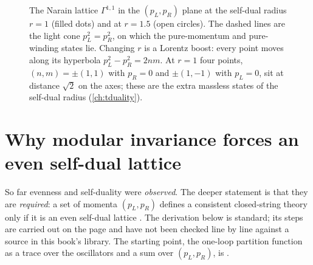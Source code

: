 \begin{figure}[t]
\centering
{}
\caption{The Narain lattice $\Gamma^{1,1}$ in the $(p_L,p_R)$ plane at the self-dual radius
$r=1$ (filled dots) and at $r=1.5$ (open circles). The dashed lines are the light cone
$p_L^2=p_R^2$, on which the pure-momentum and pure-winding states lie. Changing $r$ is a
Lorentz boost: every point moves along its hyperbola $p_L^2-p_R^2=2nm$. At $r=1$ four points,
$(n,m)=\pm(1,1)$ with $p_R=0$ and $\pm(1,-1)$ with $p_L=0$, sit at distance $\sqrt2$ on the
axes; these are the extra massless states of the self-dual radius (\cref{ch:tduality}).}
\label{fig:narain:boost}
\end{figure}

\section{Why modular invariance forces an even self-dual lattice}
\label{sec:narain:modular}

So far evenness and self-duality were \emph{observed}. The deeper statement is that they are
\emph{required}: a set of momenta $(p_L,p_R)$ defines a consistent closed-string theory only
if it is an even self-dual lattice . The derivation below is
standard; its steps are carried out on the page and have not been checked line by line
against a source in this book's library. The starting point, the one-loop partition function
as a trace over the oscillators and a sum over $(p_L,p_R)$, is
.

